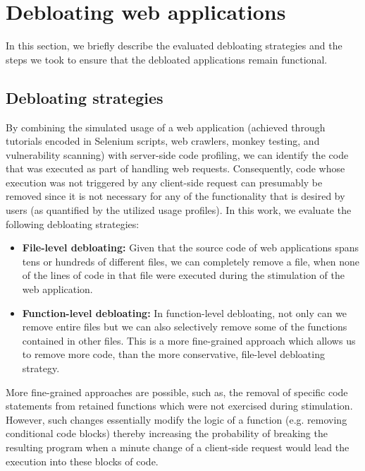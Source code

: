 \section{Debloating web applications}
\label{sec:debloating}

In this section, we briefly describe the evaluated debloating strategies and
the steps we took to ensure that the debloated applications remain functional.


\subsection{Debloating strategies}

By combining the simulated usage of a web application (achieved through
tutorials encoded in Selenium scripts, web crawlers, monkey testing, and
vulnerability scanning) with
server-side code profiling, we can identify the code that was executed
as part of handling web requests. Consequently, code whose execution was
not triggered by any client-side request can presumably be removed since
it is not necessary for any of the functionality that is desired by users
(as quantified by the utilized usage profiles).
In this work, we evaluate the following debloating strategies:

\begin{itemize}
  \item \textbf{File-level debloating:} Given that the source code of web
applications spans tens or hundreds of different files, we can completely
remove a file, when none of the lines of code in that file were executed
during the stimulation of the web application.
  \item \textbf{Function-level debloating:} In function-level debloating, not
only can we remove entire files but we can also selectively remove some of
the functions contained in other files. This is a more fine-grained approach
which allows us to remove more code, than the more conservative, file-level
debloating strategy.
\end{itemize}

More fine-grained approaches are possible, such as, the removal of specific code statements from retained functions which were not exercised during stimulation.
However, such changes essentially modify the logic of a function (e.g. removing
conditional code blocks) thereby increasing the probability of breaking the
resulting program when a minute change of a client-side request would lead the
execution into these blocks of code.

